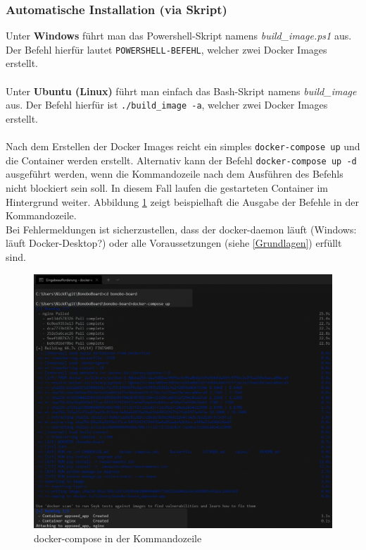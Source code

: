 \documentclass[a4paper,11pt]{scrartcl}
\begin{document}
\subsubsection{Automatische Installation (via Skript)}
Unter \textbf{Windows} führt man das Powershell-Skript namens \textit{build\_image.ps1} aus.
Der Befehl hierfür lautet \texttt{POWERSHELL-BEFEHL}, welcher zwei Docker Images erstellt.\\
\\
Unter \textbf{Ubuntu (Linux)} führt man einfach das Bash-Skript namens \textit{build\_image} aus.
Der Befehl hierfür ist \texttt{./build\_image -a}, welcher zwei Docker Images erstellt.\\
\\
Nach dem Erstellen der Docker Images reicht ein simples \texttt{docker-compose up} und
die Container werden erstellt. Alternativ kann der Befehl \texttt{docker-compose up -d} ausgeführt werden,
wenn die Kommandozeile nach dem Ausführen des Befehls nicht blockiert sein soll.
In diesem Fall laufen die gestarteten Container im Hintergrund weiter.
Abbildung \ref{img:docker-compose} zeigt beispielhaft die Ausgabe der Befehle in der Kommandozeile.\\ 
Bei Fehlermeldungen ist sicherzustellen, dass der docker-daemon läuft (Windows: läuft Docker-Desktop?) oder alle Voraussetzungen (siehe \ref{Grundlagen}) erfüllt sind.
\begin{figure}[H]
\begin{center}
\includegraphics[width=0.8\linewidth]{docker-compose}
\caption{docker-compose in der Kommandozeile}
\label{img:docker-compose}
\end{center}
\end{figure}
\end{document}
